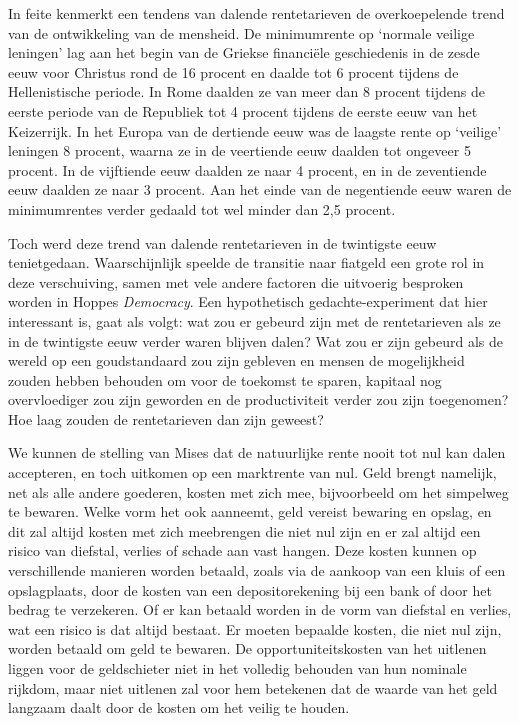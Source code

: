 \begin{blockquotebox}
    In feite kenmerkt een tendens van dalende rentetarieven de overkoepelende trend van de ontwikkeling van de mensheid. De minimumrente op `normale veilige leningen' lag aan het begin van de Griekse financiële geschiedenis in de zesde eeuw voor Christus rond de 16 procent en daalde tot 6 procent tijdens de Hellenistische periode. In Rome daalden ze van meer dan 8 procent tijdens de eerste periode van de Republiek tot 4 procent tijdens de eerste eeuw van het Keizerrijk. In het Europa van de dertiende eeuw was de laagste rente op `veilige' leningen 8 procent, waarna ze in de veertiende eeuw daalden tot ongeveer 5 procent. In de vijftiende eeuw daalden ze naar 4 procent, en in de zeventiende eeuw daalden ze naar 3 procent. Aan het einde van de negentiende eeuw waren de minimumrentes verder gedaald tot wel minder dan 2,5 procent.\footnotemark
\end{blockquotebox}

Toch werd deze trend van dalende rentetarieven in de twintigste eeuw tenietgedaan. Waarschijnlijk speelde de transitie naar fiatgeld een grote rol in deze verschuiving, samen met vele andere factoren die uitvoerig besproken worden in Hoppe\textquotesingle s \emph{Democracy}. Een hypothetisch gedachte-experiment dat hier interessant is, gaat als volgt: wat zou er gebeurd zijn met de rentetarieven als ze in de twintigste eeuw verder waren blijven dalen? Wat zou er zijn gebeurd als de wereld op een goudstandaard zou zijn gebleven en mensen de mogelijkheid zouden hebben behouden om voor de toekomst te sparen, kapitaal nog overvloediger zou zijn geworden en de productiviteit verder zou zijn toegenomen? Hoe laag zouden de rentetarieven dan zijn geweest?

We kunnen de stelling van Mises dat de natuurlijke rente nooit tot nul kan dalen accepteren, en toch uitkomen op een marktrente van nul. Geld brengt namelijk, net als alle andere goederen, kosten met zich mee, bijvoorbeeld om het simpelweg te bewaren. Welke vorm het ook aanneemt, geld vereist bewaring en opslag, en dit zal altijd kosten met zich meebrengen die niet nul zijn en er zal altijd een risico van diefstal, verlies of schade aan vast hangen. Deze kosten kunnen op verschillende manieren worden betaald, zoals via de aankoop van een kluis of een opslagplaats, door de kosten van een depositorekening bij een bank of door het bedrag te verzekeren. Of er kan betaald worden in de vorm van diefstal en verlies, wat een risico is dat altijd bestaat. Er moeten bepaalde kosten, die niet nul zijn, worden betaald om geld te bewaren. De opportuniteitskosten van het uitlenen liggen voor de geldschieter niet in het volledig behouden van hun nominale rijkdom, maar niet uitlenen zal voor hem betekenen dat de waarde van het geld langzaam daalt door de kosten om het veilig te houden.

